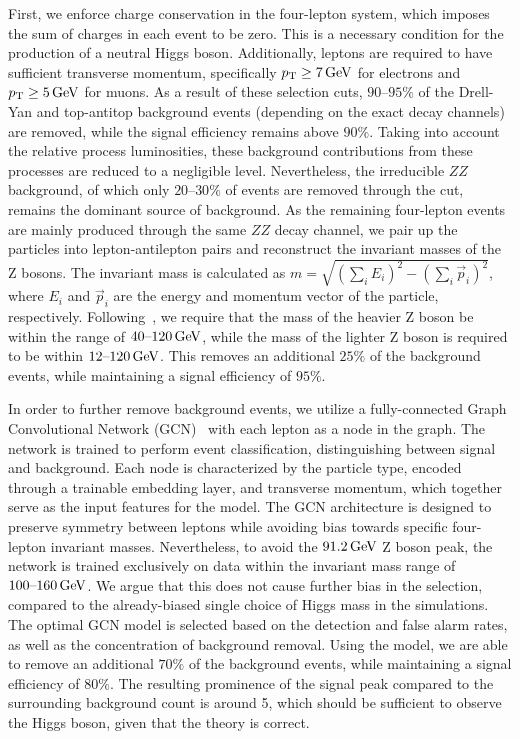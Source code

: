 \documentclass[aps,twocolumn,secnumarabic,balancelastpage,amsmath,amssymb,nofootinbib,floatfix]{revtex4-1}
\newcommand{\GeV}{\,{\rm GeV}}
\begin{document}
First, we enforce charge conservation in the four-lepton system, which imposes the sum of charges in each event to be zero. This is a necessary condition for the production of a neutral Higgs boson. Additionally, leptons are required to have sufficient transverse momentum, specifically $p_{\rm{T}} \geq 7\GeV$ for electrons and $p_{\rm{T}} \geq 5\GeV$ for muons. As a result of these selection cuts, $90 \text{--} 95\%$ of the Drell-Yan and top-antitop background events (depending on the exact decay channels) are removed, while the signal efficiency remains above $90\%$. Taking into account the relative process luminosities, these background contributions from these processes are reduced to a negligible level. Nevertheless, the irreducible $ZZ$ background, of which only $20 \text{--} 30\%$ of events are removed through the cut, remains the dominant source of background. As the remaining four-lepton events are mainly produced through the same $ZZ$ decay channel, we pair up the particles into lepton-antilepton pairs and reconstruct the invariant masses of the Z bosons. The invariant mass is calculated as $m = \sqrt{\left(\sum_i E_i\right)^2 - \left(\sum_i \vec{p}_i\right)^2}$, where $E_i$ and $\vec{p}_i$ are the energy and momentum vector of the particle, respectively. Following~\citep{CMS2012}, we require that the mass of the heavier Z boson be within the range of $40 \text{--} 120\GeV$, while the mass of the lighter Z boson is required to be within $12 \text{--} 120\GeV$. This removes an additional $25\%$ of the background events, while maintaining a signal efficiency of $95\%$.

In order to further remove background events, we utilize a fully-connected Graph Convolutional Network (GCN)~\citep{KipfWelling2016} with each lepton as a node in the graph. The network is trained to perform event classification, distinguishing between signal and background. Each node is characterized by the particle type, encoded through a trainable embedding layer, and transverse momentum, which together serve as the input features for the model. The GCN architecture is designed to preserve symmetry between leptons while avoiding bias towards specific four-lepton invariant masses. Nevertheless, to avoid the $91.2 \GeV$ Z boson peak, the network is trained exclusively on data within the invariant mass range of $100 \text{--} 160\GeV$. We argue that this does not cause further bias in the selection, compared to the already-biased single choice of Higgs mass in the simulations. The optimal GCN model is selected based on the detection and false alarm rates, as well as the concentration of background removal. Using the model, we are able to remove an additional $70\%$ of the background events, while maintaining a signal efficiency of $80\%$. The resulting prominence of the signal peak compared to the surrounding background count is around 5, which should be sufficient to observe the Higgs boson, given that the theory is correct.
\end{document}

